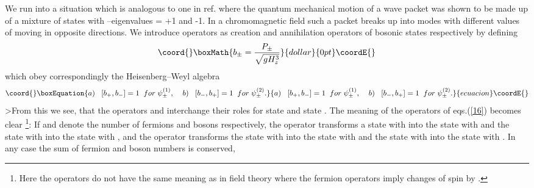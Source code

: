 \documentclass[a4paper,12pt,a4]{article}
\begin{document}
We run into a situation which is analogous to one
in ref.\cite{12} where the quantum mechanical motion of
a wave packet was shown to be made up of a mixture of
states with \coordHE{}--eigenvalues = +1 and -1. 
In a chromomagnetic field  such
a packet breaks up into modes with different values
of \coordHE{} moving in opposite directions.
We introduce operators \coordHE{} as
creation and annihilation operators
of bosonic states respectively by defining 
$$\coord{}\boxMath{
b_{\pm} = \frac{P_{\pm}}{\sqrt{gH^3_z}}
}{dollar}{0pt}\coordE{}$$
which obey
correspondingly  the Heisenberg--Weyl algebra
\begin{equation}\coord{}\boxEquation{
a) \;\;\; [b_+,b_-] = 1 \;\; for \; \psi^{(1)}_{\pm},
 \;\;\;\; b)\;\;\; [b_-, b_+]= 1
\;\; for \; \psi^{(2)}_{\pm}.
\label{21}
}{
a) \;\;\; [b_+,b_-] = 1 \;\; for \; \psi^{(1)}_{\pm},
 \;\;\;\; b)\;\;\; [b_-, b_+]= 1
\;\; for \; \psi^{(2)}_{\pm}.
}{ecuacion}\coordE{}\end{equation}
>From this we see, that the operators \coordHE{}
and \coordHE{} interchange their roles
for  state \coordHE{}
and  state \coordHE{}.
The meaning of the operators \coordHE{}
of eqs.(\ref{16}) becomes
clear \footnote{Here the operators
\coordHE{} do not have the same meaning as in field
theory where the fermion operators
imply changes of spin by \coordHE{}.}:
If \coordHE{} and \coordHE{} denote the number of fermions
 and
bosons respectively,
the operator \coordHE{} transforms a state \coordHE{}
with \coordHE{} into the state
\coordHE{} with \coordHE{}
and the state \coordHE{} with
\coordHE{} into the state
\coordHE{} with \coordHE{}, and
the operator \coordHE{} transforms the state
\coordHE{} with \coordHE{} into the state \coordHE{}
with \coordHE{} and the state \coordHE{} with
\coordHE{} into the state \coordHE{}
with \coordHE{}.  In any case the sum
of fermion and boson numbers is conserved, \coordHE{}
\end{document}
